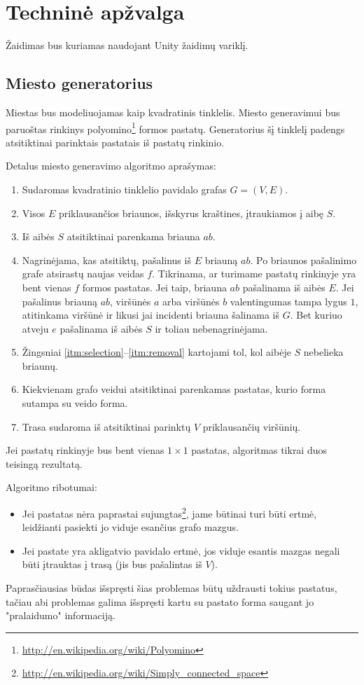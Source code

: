 \section{Techninė apžvalga}

Žaidimas bus kuriamas naudojant Unity žaidimų variklį.

\subsection{Miesto generatorius}

Miestas bus modeliuojamas kaip kvadratinis tinklelis.
Miesto generavimui bus paruoštas rinkinys polyomino\footnote{\url{http://en.wikipedia.org/wiki/Polyomino}} formos pastatų.
Generatorius šį tinklelį padengs atsitiktinai parinktais pastatais iš pastatų rinkinio.

Detalus miesto generavimo algoritmo aprašymas:
\begin{enumerate}
\item Sudaromas kvadratinio tinklelio pavidalo grafas $G = (V, E)$.
\item Visos $E$ priklausančios briaunos, išskyrus kraštines, įtraukiamos į aibę $S$.
\item \label{itm:selection}
    Iš aibės $S$ atsitiktinai parenkama briauna $ab$.
\item \label{itm:removal}
    Nagrinėjama, kas atsitiktų, pašalinus iš $E$ briauną $ab$.
    Po briaunos pašalinimo grafe atsirastų naujas veidas $f$.
    Tikrinama, ar turimame pastatų rinkinyje yra bent vienas $f$ formos pastatas.
    Jei taip, briauna $ab$ pašalinama iš aibės $E$.
    Jei pašalinus briauną $ab$, viršūnės $a$ arba viršūnės $b$ valentingumas tampa lygus $1$, atitinkama viršūnė ir likusi jai incidenti briauna šalinama iš $G$.
    Bet kuriuo atveju $e$ pašalinama iš aibės $S$ ir toliau nebenagrinėjama.
\item Žingsniai \ref{itm:selection}--\ref{itm:removal} kartojami tol, kol aibėje $S$ nebelieka briaunų.
\item Kiekvienam grafo veidui atsitiktinai parenkamas pastatas, kurio forma sutampa su veido forma.
\item Trasa sudaroma iš atsitiktinai parinktų $V$ priklausančių viršūnių.
\end{enumerate}

Jei pastatų rinkinyje bus bent vienas $1 \times 1$ pastatas, algoritmas tikrai duos teisingą rezultatą.

Algoritmo ribotumai:
\begin{itemize}
\item Jei pastatas nėra paprastai sujungtas\footnote{\url{http://en.wikipedia.org/wiki/Simply_connected_space}}, jame būtinai turi būti ertmė, leidžianti pasiekti jo viduje esančius grafo mazgus.
\item Jei pastate yra akligatvio pavidalo ertmė, jos viduje esantis mazgas negali būti įtrauktas į trasą (jis bus pašalintas iš $V$).
\end{itemize}
Paprasčiausias būdas išspręsti šias problemas būtų uždrausti tokius pastatus, tačiau abi problemas galima išspręsti kartu su pastato forma saugant jo "pralaidumo" informaciją.
